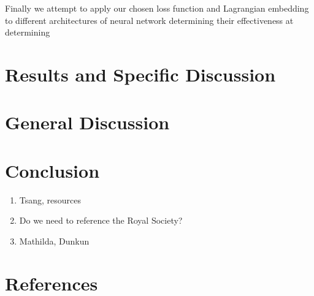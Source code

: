 \documentclass[10pt]{iopart}
\begin{document}
Finally we attempt to apply our chosen loss function and Lagrangian embedding to different architectures of neural network determining their effectiveness at determining

\section{Results and Specific Discussion}


\section{General Discussion}



\section{Conclusion}

\ack

\begin{enumerate}
	\item Tsang, resources
	\item Do we need to reference the Royal Society?
	\item Mathilda, Dunkun
\end{enumerate}

\section*{References}


\end{document}
